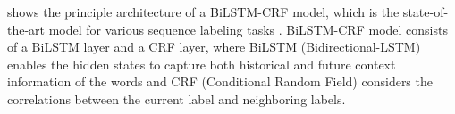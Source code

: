  shows the principle architecture of a BiLSTM-CRF model,
which is the state-of-the-art model for various sequence labeling tasks \cite{huang2015bidirectional,reimers2017optimal}.
BiLSTM-CRF model consists of a BiLSTM layer and a CRF layer, 
where BiLSTM (Bidirectional-LSTM) enables the
hidden states to capture both historical and future
context information of the words and 
CRF (Conditional Random Field) considers the correlations
between the current label and neighboring
labels.
%
%
